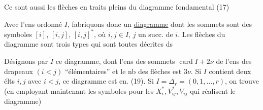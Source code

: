 
Ce sont aussi les  flèches en traits pleins du diagramme fondamental (17)

Avec l'ens ordonné $I$, fabriquons donc un  \uline{diagramme} dont les sommets sont  des symboles  $[i]$, $[i,j]$, $[i,j]^*$, où $i,j\in I$, $j$ un succ. de $i$. Les flèches du diagramme sont  trois types qui sont toutes décrites ds

Désignons par $\widetilde I$ ce diagramme, dont l'ens des sommets     $\operatorname{card}I+2\nu$   de l'ens des drapeaux $(i<j)$ ``élémentaires''  et le nb des flèches est $3\nu$. Si $I$ contient  deux élts $i,j$ avec $i<j$,  ce diagramme est en. (19). Si $I=\Delta_r=(0,1,\ldots,r)$, on trouve (en employant maintenant les symboles pour les $X_i^*,V_{ij}^*,V_{ij}$ qui réalisent le diagramme)

